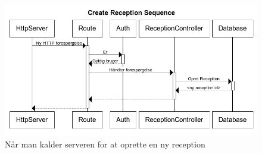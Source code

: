 \begin{figure}[ht!]
\centering
\includegraphics[width=\textwidth]{images/serversequence.png}
\caption{Når man kalder serveren for at oprette en ny reception}
\label{fig:serversequence}
\end{figure}